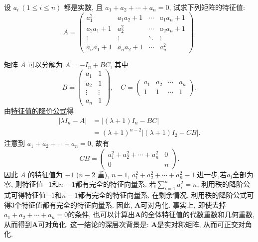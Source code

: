 \documentclass[../../main.tex]{subfiles}%
\begin{document}
\begin{example}
设 $a_i \ (1 \leqslant  i \leqslant  n)$ 都是实数, 且 $a_1 + a_2 + \cdots + a_n = 0$, 试求下列矩阵的特征值:
\[
A = 
\begin{pmatrix}
a_1^2 & a_1 a_2 + 1 & \cdots & a_1 a_n + 1 \\
a_2 a_1 + 1 & a_2^2 & \cdots & a_2 a_n + 1 \\
\vdots & \vdots & \ddots & \vdots \\
a_n a_1 + 1 & a_n a_2 + 1 & \cdots & a_n^2
\end{pmatrix}.
\]
\end{example}
\begin{solution}
矩阵 $A$ 可以分解为 $A = -I_n + BC$, 其中
\[
B = 
\begin{pmatrix}
a_1 & 1 \\
a_2 & 1 \\
\vdots & \vdots \\
a_n & 1
\end{pmatrix}, \quad
C = 
\begin{pmatrix}
a_1 & a_2 & \cdots & a_n \\
1 & 1 & \cdots & 1
\end{pmatrix}.
\]
由\hyperref[theorem:特征值的降价公式]{特征值的降价公式}得
\begin{align*}
| \lambda I_n - A | 
&= | (\lambda + 1) I_n - BC | \\
&= (\lambda + 1)^{n-2} | (\lambda + 1) I_2 - CB |.
\end{align*}
注意到 $a_1 + a_2 + \cdots + a_n = 0$, 故有
\[
CB = 
\begin{pmatrix}
a_1^2 + a_2^2 + \cdots + a_n^2 & 0 \\
0 & n
\end{pmatrix}.
\]
因此 $A$ 的特征值为 $-1$ ($n-2$ 重), $n-1$, $a_1^2 + a_2^2 + \cdots + a_n^2 - 1$.进一步,若\(a_i\)全部为零, 则特征值\(-1\)和\(n - 1\)都有完全的特征向量系. 若\(\sum_{i = 1}^{n}a_i^2 = n\), 利用秩的降阶公式可得特征值\(-1\)和\(n - 1\)都有完全的特征向量系. 在剩余情况, 利用秩的降阶公式可得\(3\)个特征值都有完全的特征向量系. 因此, \(\boldsymbol{A}\)可对角化. 事实上, 即使去掉\(a_1 + a_2+\cdots + a_n = 0\)的条件, 也可以计算出\(\boldsymbol{A}\)的全体特征值的代数重数和几何重数, 从而得到\(\boldsymbol{A}\)可对角化. 这一结论的深层次背景是: \(\boldsymbol{A}\)是实对称矩阵, 从而可正交对角化.

\end{solution}
\end{document}
